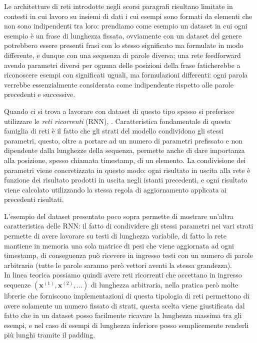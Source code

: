 \documentclass[../../main.tex]{subfiles}
\begin{document}
Le architetture di reti introdotte negli scorsi paragrafi risultano limitate in contesti in cui lavoro su insiemi di dati i cui esempi sono formati da elementi che non sono indipendenti tra loro: prendiamo come esempio un dataset in cui ogni esempio è un frase di lunghezza fissata, ovviamente con un dataset del genere potrebbero essere presenti frasi con lo stesso significato ma formulate in modo differente, e dunque con una sequenza di parole diversa; una rete feedforward avendo parametri diversi per ognuna delle posizioni della frase faticherebbe a riconoscere esempi con significati uguali, ma formulazioni differenti: ogni parola verrebbe essenzialmente considerata come indipendente rispetto alle parole precedenti e successive.

Quando ci si trova a lavorare con dataset di questo tipo spesso si preferisce utilizzare le \textit{reti ricorrenti} (RNN), \cite{rumelhart:errorpropnonote}. Caratteristica fondamentale di questa famiglia di reti è il fatto che gli strati del modello condividono gli stessi parametri, questo, oltre a portare ad un numero di parametri prefissato e non dipendente dalla lunghezze della sequenza, permette anche di dare importanza alla posizione, spesso chiamata timestamp, di un elemento. La condivisione dei parametri viene concretizzata in questo modo: ogni risultato in uscita alla rete è funzione dei risultato prodotti in uscita negli istanti precedenti, e ogni risultato viene calcolato utilizzando la stessa regola di aggiornamento applicata ai precedenti risultati.

L'esempio del dataset presentato poco sopra permette di mostrare un'altra caratteristica delle RNN: il fatto di condividere gli stessi parametri nei vari strati permette di avere lavorare su testi di lunghezza variabile, di fatto la rete mantiene in memoria una sola matrice di pesi che viene aggiornata ad ogni timestamp, di conseguenza può ricevere in ingresso testi con un numero di parole arbitrario (tutte le parole saranno però vettori aventi la stessa grandezza).\\
In linea teorica possiamo quindi avere reti ricorrenti che accettano in ingresso sequenze $(\boldsymbol{x}^{(1)}, \boldsymbol{x}^{(2)}, \dots)$ di lunghezza arbitraria, nella pratica però molte librerie che forniscono implementazioni di questa tipologia di reti permettono di avere solamente un numero fissato di strati, questa scelta viene giustificata dal fatto che in un dataset posso facilmente ricavare la lunghezza massima tra gli esempi, e nel caso di esempi di lunghezza inferiore posso semplicemente renderli più lunghi tramite il padding.
\end{document}

